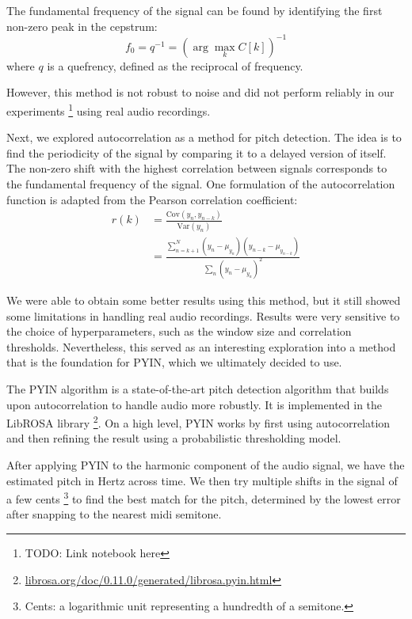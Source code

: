 The fundamental frequency of the signal can be found by identifying the first non-zero peak in the cepstrum:
$$f_0 = q^{-1} = \left(\arg\max_{k} C[k]\right)^{-1}$$
where $q$ is a quefrency, defined as the reciprocal of frequency.

However, this method is not robust to noise and did not perform reliably in our experiments \footnote{TODO: Link notebook here} using real audio recordings.


Next, we explored autocorrelation as a method for pitch detection. The idea is to find the periodicity of the signal by comparing it to a delayed version of itself. The non-zero shift with the highest correlation between signals corresponds to the fundamental frequency of the signal. One formulation of the autocorrelation function is adapted from the Pearson correlation coefficient:
\begin{align*}
    r(k)
    &= \frac{\text{Cov}(y_n, y_{n-k})}{\text{Var}(y_n)} \\
    &= \frac{\sum_{n=k+1}^N (y_n - \mu_{y_n}) (y_{n-k} - \mu_{y_{n-k}})}{\sum_n (y_n - \mu_{y_n})^2}
\end{align*}

We were able to obtain some better results using this method, but it still showed some limitations in handling real audio recordings. Results were very sensitive to the choice of hyperparameters, such as the window size and correlation thresholds. Nevertheless, this served as an interesting exploration into a method that is the foundation for PYIN, which we ultimately decided to use.


The PYIN algorithm \autocite{PYIN:2014} is a state-of-the-art pitch detection algorithm that builds upon autocorrelation to handle audio more robustly. It is implemented in the LibROSA library \footnote{\href{https://librosa.org/doc/0.11.0/generated/librosa.pyin.html}{librosa.org/doc/0.11.0/generated/librosa.pyin.html}}. On a high level, PYIN works by first using autocorrelation and then refining the result using a probabilistic thresholding model.

After applying PYIN to the harmonic component of the audio signal, we have the estimated pitch in Hertz across time. We then try multiple shifts in the signal of a few cents \footnote{Cents: a logarithmic unit representing a hundredth of a semitone.} to find the best match for the pitch, determined by the lowest error after snapping to the nearest midi semitone.

